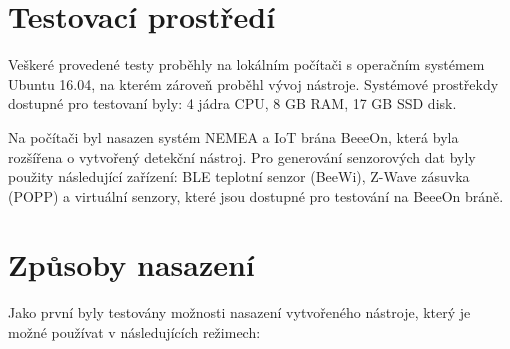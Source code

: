 
\section{Testovací prostředí}
Veškeré provedené testy proběhly na lokálním počítači s operačním systémem Ubuntu 16.04,
na kterém zároveň proběhl vývoj nástroje. Systémové
prostřekdy dostupné pro testovaní byly: 4 jádra CPU, 8 GB RAM, 17 GB SSD disk.

Na počítači byl nasazen systém NEMEA a IoT brána BeeeOn, která byla rozšířena o vytvořený detekční 
nástroj. Pro generování senzorových dat byly použity následující zařízení: BLE teplotní senzor (BeeWi), 
Z-Wave zásuvka (POPP) a virtuální senzory, které jsou dostupné pro testování na BeeeOn bráně.

\section{Způsoby nasazení}
Jako první byly testovány možnosti nasazení vytvořeného nástroje, který je možné používat v 
následujících režimech:

